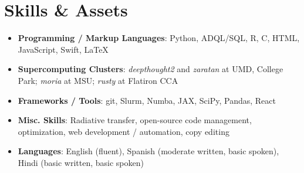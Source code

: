 \documentclass[letterpaper,10.5pt]{article}
\newcommand{\resumeSubHeadingListStart}{\begin{itemize}[leftmargin=*]}
\newcommand{\resumeSubHeadingListEnd}{\end{itemize}}
\newcommand{\shorterSection}[1]{\vspace{-10pt}\section{#1}}
\begin{document}
\shorterSection{Skills \& Assets}
  \resumeSubHeadingListStart
  \small
    \item{
     \textbf{Programming / Markup Languages}{: Python, ADQL/SQL, R, C, HTML, JavaScript, Swift, \LaTeX}
    }
    \vspace{-5pt}
    \item{
     \textbf{Supercomputing Clusters}{: \textit{deepthought2} and \textit{zaratan} at UMD, College Park; \textit{moria} at MSU; \textit{rusty} at Flatiron CCA}
    }
    \vspace{-5pt}
    \item{
     \textbf{Frameworks / Tools}{: git, Slurm, Numba, JAX, SciPy, Pandas, React}
    }
    \vspace{-5pt}
    \item{
     \textbf{Misc. Skills}{: Radiative transfer, open-source code management, optimization, web development / automation, copy editing}
    }
    \vspace{-5pt}
    \item{
     \textbf{Languages}{: English (fluent), Spanish (moderate written, basic spoken), Hindi (basic written, basic spoken)}
    }
\resumeSubHeadingListEnd
\end{document}
